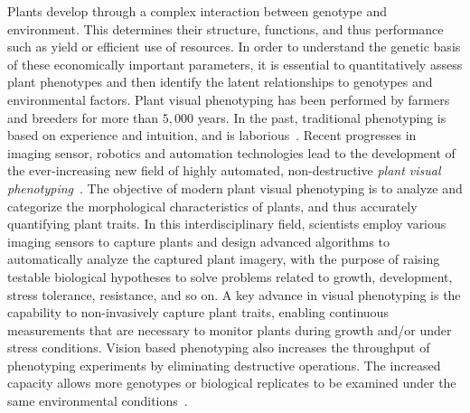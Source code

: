 Plants develop through a complex interaction between genotype and environment. 
This determines their structure, functions, and thus performance such as yield or efficient use of resources. 
In order to understand the genetic basis of these economically important parameters, it is essential to quantitatively assess plant phenotypes and then identify the latent relationships to genotypes and environmental factors.
%
Plant visual phenotyping has been performed by farmers and breeders for more than $5,000$ years. 
In the past, traditional phenotyping is based on experience and intuition, and is laborious~\cite{johannsenerblichkeit}. 
Recent progresses in imaging sensor, robotics and automation technologies lead to the development of the ever-increasing new field of highly automated, non-destructive {\it plant visual phenotyping}~\cite{furbank2011phenomics,cruz2015depi}. 
%
The objective of modern  plant visual phenotyping is to analyze and categorize the morphological characteristics of plants, and thus accurately quantifying plant traits. %
In this interdisciplinary field, scientists employ various imaging sensors to capture plants and design advanced algorithms to automatically analyze the captured plant imagery, with the purpose of raising testable biological hypotheses to solve problems related to growth, development, stress tolerance, resistance, and so on.
%
%
A key advance in visual phenotyping is the capability to non-invasively capture plant traits, enabling continuous measurements that are necessary to monitor plants during growth and/or under stress conditions. Vision based phenotyping also increases the throughput of phenotyping experiments by eliminating destructive operations. 
The increased capacity allows more genotypes or biological replicates to be examined under the same environmental conditions~\cite{fahlgren2015lights,walter2015plant}.

